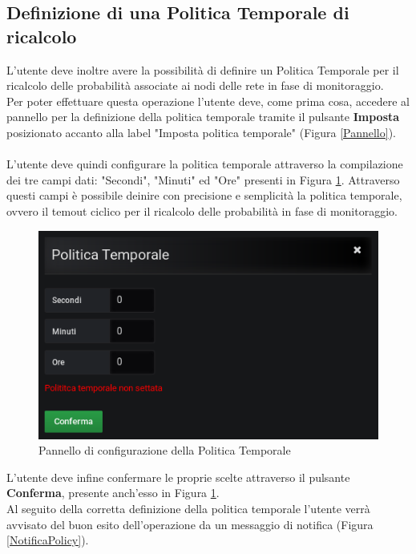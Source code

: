 \subsection{Definizione di una Politica Temporale di ricalcolo}\label{policy}

L'utente deve inoltre avere la possibilità di definire un Politica Temporale per il ricalcolo delle probabilità associate ai nodi delle rete in fase di monitoraggio.\\
Per poter effettuare questa operazione l'utente deve, come prima cosa, accedere al pannello per la definizione della politica temporale tramite il pulsante \textbf{Imposta} posizionato accanto alla label "Imposta politica temporale" (Figura \ref{Pannello}).\\
~\\
L'utente deve quindi configurare la politica temporale attraverso la compilazione dei tre campi dati: "Secondi", "Minuti" ed "Ore" presenti in Figura \ref{PannelloPolicy}. Attraverso questi campi è possibile deinire con precisione e semplicità la politica temporale, ovvero il temout ciclico per il ricalcolo delle probabilità in fase di monitoraggio.

\begin{figure}[H]
	\begin{center}
		\includegraphics[scale=0.6]{./images/PannelloPolicy.png}
		 \caption{Pannello di configurazione della Politica Temporale}	
		 \label{PannelloPolicy}
	\end{center}
\end{figure} 

L'utente deve infine confermare le proprie scelte attraverso il pulsante \textbf{Conferma}, presente anch'esso in Figura \ref{PannelloPolicy}.
~\\
Al seguito della corretta definizione della politica temporale l'utente verrà avvisato del buon esito dell'operazione da un messaggio di notifica (Figura \ref{NotificaPolicy}). 

